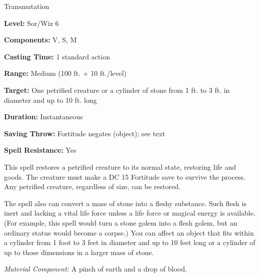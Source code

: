 
Transmutation

\textbf{Level:} Sor/Wiz 6

\textbf{Components:} V, S, M

\textbf{Casting Time:} 1 standard action

\textbf{Range:} Medium (100 ft. + 10 ft./level)

\textbf{Target:} One petrified creature or a cylinder of stone from 1 ft. to 3 
ft. in diameter and up to 10 ft. long

\textbf{Duration:} Instantaneous

\textbf{Saving Throw:} Fortitude negates (object); see text

\textbf{Spell Resistance:} Yes

This spell restores a petrified creature to its normal state, restoring life and 
goods. The creature must make a DC 15 Fortitude save to survive the process. Any 
petrified creature, regardless of size, can be restored.

The spell also can convert a mass of stone into a fleshy substance. Such flesh 
is inert and lacking a vital life force unless a life force or magical energy is 
available. (For example, this spell would turn a stone golem into a flesh golem, 
but an ordinary statue would become a corpse.) You can affect an object that fits 
within a cylinder from 1 foot to 3 feet in diameter and up to 10 feet long or a 
cylinder of up to those dimensions in a larger mass of stone.

\textit{Material Component:} A pinch of earth and a drop of blood.

